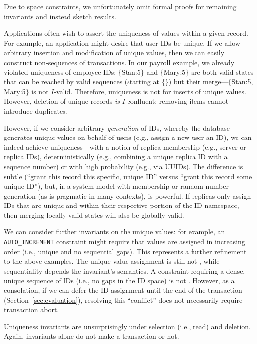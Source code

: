 Due to space constraints, we unfortunately omit formal proofs for
remaining invariants and instead sketch \iconfluence results.

 Applications often wish to assert the uniqueness
of values within a given record. For example, an application might
desire that user IDs be unique. If we allow arbitrary insertion and
modification of unique values, then we can easily construct
non-\iconfluent sequences of transactions. In our payroll example, we
already violated uniqueness of employee IDs: $\{$Stan:5$\}$ and
$\{$Mary:5$\}$ are both valid states that can be reached by valid
sequences (starting at $\{\}$) but their merge---$\{$Stan:5,
Mary:5$\}$ is not $I$-valid. Therefore, uniqueness is not \iconfluent
for inserts of unique values. However, deletion of unique records
\textit{is} $I$-confluent: removing items cannot introduce duplicates.

However, if we consider arbitrary \textit{generation} of IDs, whereby
the database generates unique values on behalf of users (e.g., assign
a new user an ID), we can indeed achieve uniqueness---with a notion of
replica membership (e.g., server or replica IDs), deterministically
(e.g., combining a unique replica ID with a sequence number) or with
high probability (e.g., via UUIDs). The difference is subtle (``grant
this record this specific, unique ID'' versus ``grant this record some
unique ID''), but, in a system model with membership or random number
generation (as is pragmatic in many contexts), is powerful. If
replicas only assign IDs that are unique and within their respective
portion of the ID namespace, then merging locally valid states will
also be globally valid.

We can consider further invariants on the unique values: for example,
an \texttt{AUTO\_INCREMENT} constraint might require that values are
assigned in increasing order (i.e., unique and no sequential
gaps). This represents a further refinement to the above examples. The
unique value assignment is still not \iconfluent, while sequentiality
depends the invariant's semantics. A constraint requiring a dense,
unique sequence of IDs (i.e., no gaps in the ID space) is not
\iconfluent. However, as a consolation, if we can defer the ID
assignment until the end of the transaction
(Section~\ref{sec:evaluation}), resolving this ``conflict'' does not
necessarily require transaction abort.

Uniqueness invariants are unsurprisingly \iconfluent under selection
(i.e., read) and deletion. Again, invariants alone do not make a
transaction \cfree or not.

